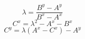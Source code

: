 \[ \lambda = \frac{B^y - A^y} {B^x - A^x} \]
\[ C^x = \lambda^2 - A^x - B^x \]
\[ C^y = \lambda(A^x - C^x) - A^y \]
